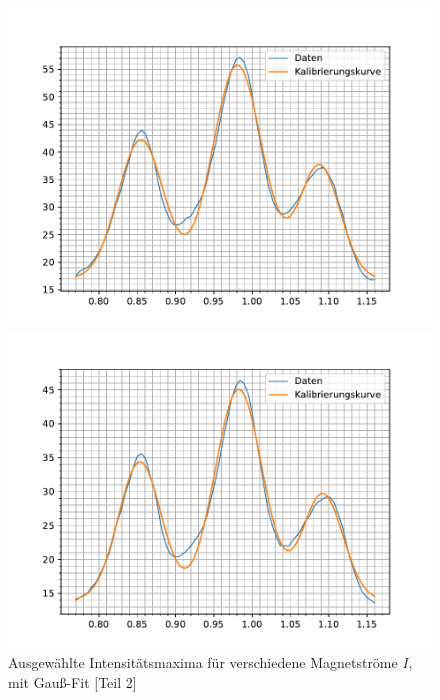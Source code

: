 \documentclass{article}
\begin{document}
\begin{figure}[h]
  \begin{minipage}{.49\linewidth}
    \centering
    \includegraphics[width=\linewidth]{gauss_8.5A.pdf}
  \end{minipage}
  \hfill
  \begin{minipage}{.49\linewidth}
    \centering
    \includegraphics[width=\linewidth]{gauss_9.1A.pdf}
  \end{minipage}
  \caption{Ausgewählte Intensitätsmaxima für verschiedene Magnetströme $I$, mit Gauß-Fit [Teil 2]}
  \label{fig:gauss-fit-2}
\end{figure}
\end{document}
